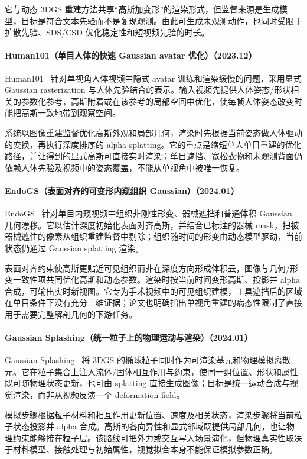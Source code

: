 它与动态 3DGS 重建方法共享“高斯加变形”的渲染形式，但监督来源是生成模型，目标是符合文本先验而不是复现观测。由此可生成未观测动作，也同时受限于扩散先验、SDS/CSD 优化稳定性和短视频先验的时长。

\paragraph{Human101（单目人体的快速 Gaussian avatar 优化）（2023.12）}
Human101~\cite{2312_15258} 针对单视角人体视频中隐式 avatar 训练和渲染缓慢的问题，采用显式 Gaussian rasterization 与人体先验结合的表示。输入视频先提供人体姿态/形状相关的参数化参考，高斯附着或在该参考的局部空间中优化，使每帧人体姿态改变时能把高斯一致地带到观察空间。

系统以图像重建监督优化高斯外观和局部几何，渲染时先根据当前姿态做人体驱动的变换，再执行深度排序的 alpha splatting。它的重点是缩短单人单目重建的优化路径，并让得到的显式高斯可直接实时渲染；单目遮挡、宽松衣物和未观测背面仍依赖人体先验及视频中的姿态覆盖，不能从单视角中被唯一恢复。

\paragraph{EndoGS（表面对齐的可变形内窥组织 Gaussian）（2024.01）}
EndoGS~\cite{2401_11535} 针对单目内窥视频中组织非刚性形变、器械遮挡和普通体积 Gaussian 几何漂移。它以估计深度初始化表面对齐高斯，并结合已标注的器械 mask，把被器械遮住的像素从组织重建监督中剔除；组织随时间的形变由动态模型驱动，当前状态仍通过 Gaussian splatting 渲染。

表面对齐约束使高斯更贴近可见组织而非在深度方向形成体积云，图像与几何/形变一致性项共同优化高斯和动态参数。渲染时按当前时间变形高斯、投影并 alpha 合成，可输出实时新视图。它专为手术视频中的可见组织建模，工具遮挡后的区域在单目条件下没有充分三维证据；论文也明确指出单视角重建的病态性限制了直接用于需要完整解剖几何的下游任务。

\paragraph{Gaussian Splashing（统一粒子上的物理运动与渲染）（2024.01）}
Gaussian Splashing~\cite{2401_15318} 将 3DGS 的椭球粒子同时作为可渲染基元和物理模拟离散元。它在粒子集合上注入流体/固体相互作用与约束，使同一组位置、形状和属性既可随物理状态更新，也可由 splatting 直接生成图像；目标是统一运动合成与视觉渲染，而非从视频反演一个 deformation field。

模拟步骤根据粒子材料和相互作用更新位置、速度及相关状态，渲染步骤将当前粒子状态投影并 alpha 合成。高斯的各向异性和显式邻域既提供局部几何，也让物理约束能够接在粒子层。该路线可把外力或交互写入场景演化，但物理真实性取决于材料模型、接触处理与初始属性，视觉拟合本身不能保证模拟参数正确。

